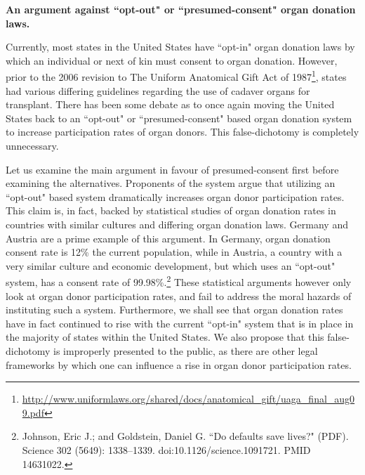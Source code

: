 \documentclass[letterpaper,10pt,twoside]{article}
\begin{document}
\begin{center}
\textbf{\large{An argument against ``opt-out" or ``presumed-consent" organ donation laws.}}
\end{center}
\vspace{0.5em}
Currently, most states in the United States have ``opt-in" organ donation laws by which an individual or next of kin must consent to organ donation.  However, prior to the 2006 revision to The Uniform Anatomical Gift Act of 1987\footnote{\url{http://www.uniformlaws.org/shared/docs/anatomical_gift/uaga_final_aug09.pdf}}, states had various differing guidelines regarding the use of cadaver organs for transplant.  There has been some debate as to once again moving the United States back to an ``opt-out" or ``presumed-consent" based organ donation system to increase participation rates of organ donors.  This false-dichotomy is completely unnecessary.  

Let us examine the main argument in favour of presumed-consent first before examining the alternatives.  Proponents of the system argue that utilizing an ``opt-out" based system dramatically increases organ donor participation rates.  This claim is, in fact, backed by statistical studies of organ donation rates in countries with similar cultures and differing organ donation laws.  Germany and Austria are a prime example of this argument.  In Germany, organ donation consent rate is 12\% the current population, while in Austria, a country with a very similar culture and economic development, but which uses an ``opt-out" system, has a consent rate of 99.98\%.\footnote{ Johnson, Eric J.; and Goldstein, Daniel G. ``Do defaults save lives?" (PDF). Science 302 (5649): 1338–1339. doi:10.1126/science.1091721. PMID 14631022.}  These statistical arguments however only look at organ donor participation rates, and fail to address the moral hazards of instituting such a system.  Furthermore, we shall see that organ donation rates have in fact continued to rise with the current ``opt-in" system that is in place in the majority of states within the United States.  We also propose that this false-dichotomy is improperly presented to the public, as there are other legal frameworks by which one can influence a rise in organ donor participation rates.
\end{document}
